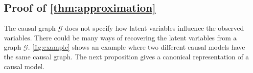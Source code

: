 \subsection{Proof of \cref{thm:approximation}}
The causal graph $ \mathcal{G} $ does not specify how latent variables influence the observed variables. There could be many ways of recovering the latent variables from a graph $\mathcal{G}$. \cref{fig:example} shows an example where two different causal models have the same causal graph. The next proposition gives a canonical representation of a causal model. 
\begin{figure}[!htb]
  \centering
  




\begin{tikzpicture}[x=0.75pt,y=0.75pt,yscale=-1,xscale=1]


\end{tikzpicture}
\end{figure}
